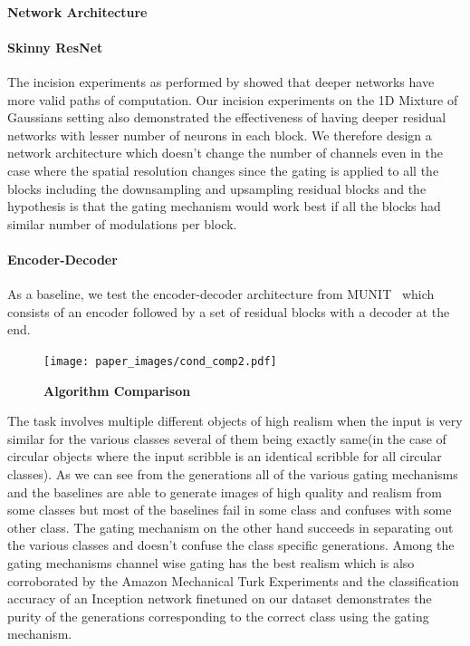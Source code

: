 \paragraph{Network Architecture}

\paragraph{Skinny ResNet}

The incision experiments as performed by \cite{veit2016residual} showed that deeper networks have more  valid paths of computation. Our incision experiments on the 1D Mixture of Gaussians setting also demonstrated the effectiveness of having deeper residual networks with lesser number of neurons in each block. We therefore design a network architecture which doesn't change the number of channels even in the case where the spatial resolution changes since the gating is applied to all the blocks including the downsampling and upsampling residual blocks and the hypothesis is that the gating mechanism would work best if all the blocks had similar number of modulations per block.

\paragraph{Encoder-Decoder} As a baseline, we test the encoder-decoder architecture from MUNIT~\cite{huang2018multimodal} which consists of an encoder followed by a set of residual blocks with a decoder at the end. 


\begin{figure}[h]
    \centering
    \texttt{[image: paper\_images/cond\_comp2.pdf]}
    \caption{{\bf Algorithm Comparison} \label{fig:alg_comp} }
    \vspace{-4mm}
\end{figure}

The task involves multiple different objects of high realism when the input is very similar for the various classes several of them being exactly same(in the case of circular objects where the input scribble is an identical scribble for all circular classes). As we can see from the generations  all of the various gating mechanisms and the baselines are able to generate images of high quality and realism from some classes but most of the baselines fail in some class and confuses with some other class. The gating mechanism on the other hand succeeds in separating out the various classes and doesn't confuse the class specific generations. Among the gating mechanisms channel wise gating has the best realism which is also corroborated by the Amazon Mechanical Turk Experiments and the classification accuracy of an Inception network finetuned on our dataset demonstrates the purity of the generations corresponding to the correct class using the gating mechanism.  

